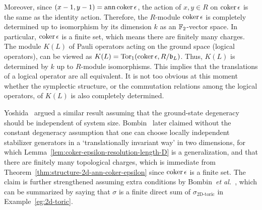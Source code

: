 Moreover, since $(x-1,y-1) = \mathop{\mathrm{ann}}\nolimits \mathop{\mathrm{coker}}\nolimits \epsilon$,
the action of $x,y \in R$ on $\mathop{\mathrm{coker}}\nolimits \epsilon$ is the same as the identity action.
Therefore, the $R$-module $\mathop{\mathrm{coker}}\nolimits \epsilon$ is completely determined
up to isomorphism by its dimension $k$ as an $\mathbb{F}_2$-vector space.
In particular, $\mathop{\mathrm{coker}}\nolimits \epsilon$ is a finite set,
which means there are finitely many charges.
The module $K(L)$ of Pauli operators acting on the ground space (logical operators),
can be viewed as $K(L) = \mathop{\mathrm{Tor}}\nolimits_1(\mathop{\mathrm{coker}}\nolimits \epsilon, R/\mathfrak{b}_L)$.
Thus, $K(L)$ is determined by $k$ up to $R$-module isomorphisms.
This implies that the translations of a logical operator are all equivalent.
It is not too obvious at this moment whether the symplectic structure,
or the commutation relations among the logical operators,
of $K(L)$ is also completely determined.

Yoshida~\cite{Yoshida2011Classification} argued a similar result assuming
that the ground-state degeneracy should be independent of system size.
Bombin~\cite{Bombin2011Structure} later claimed without the constant degeneracy assumption
that one can choose locally independent stabilizer generators in a `translationally invariant way'
in two dimensions, for which Lemma~\ref{lem:coker-epsilon-resolution-length-D} is a generalization,
and that there are finitely many topological charges,
which is immediate from Theorem~\ref{thm:structure-2d-ann-coker-epsilon} since $\mathop{\mathrm{coker}}\nolimits \epsilon$ is a finite set.
The claim is further strengthened assuming extra conditions by Bombin~\emph{et al.}~\cite{BombinDuclosCianciPoulin2012},
which can be summarized by saying
that $\sigma$ is a finite direct sum of $\sigma_\text{2D-toric}$ in Example~\ref{eg:2d-toric}.

